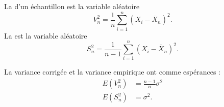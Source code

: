 La  d'un échantillon est la variable aléatoire
\begin{equation}
    V_n^2=\frac{1}{ n }\sum_{i=1}^n(X_i-\bar X_n)^2.
\end{equation}
La  est la variable aléatoire
\begin{equation}        \label{Eqdefvarempicorri}
    S_n^2=\frac{1}{ n-1 }\sum_{i=1}^n(X_i-\bar X_n)^2.
\end{equation}

\begin{lemma}
    La variance corrigée et la variance empirique ont comme espérances :
    \begin{subequations}
        \begin{align}
            E(V_n^2)&=\frac{ n-1 }{ n }\sigma^2\\
            E(S_n^2)&=\sigma^2.
        \end{align}
    \end{subequations}
\end{lemma}

